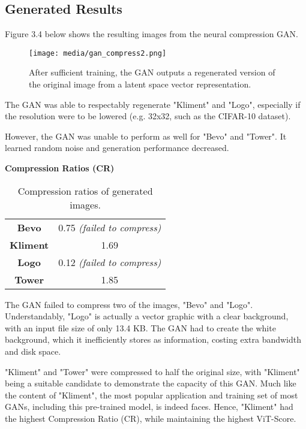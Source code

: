 \subsection{Generated Results}

Figure 3.4 below shows the resulting images from the neural compression GAN.

\begin{figure}[H]
	\begin{center}
	\texttt{[image: media/gan\_compress2.png]}
	\end{center}
	\caption[Neural Compression and Generation]{After sufficient training, the GAN outputs a regenerated
    version of the original image from a latent space vector representation.}
	\end{figure}

\vspace{5mm}   


The GAN was able to respectably regenerate "Kliment" and "Logo", especially if the resolution
were to be lowered (e.g. 32x32, such as the CIFAR-10 dataset).

However, the GAN was unable to perform as well for "Bevo" and "Tower".
It learned random noise and generation performance decreased.


\textbf{Compression Ratios (CR)}

\begin{table}[H]
\begin{center}
\begin{tabular}{|c|c|}
\hline
\textbf{Bevo}	& 0.75 \textit{(failed to compress)}\\
\textbf{Kliment}	& 1.69\\
\textbf{Logo}	& 0.12 \textit{(failed to compress)}\\
\textbf{Tower} & 1.85\\\hline

\end{tabular}
\caption[Results: Compression Ratios]{Compression ratios of generated images.}
\end{center}
\end{table}

The GAN failed to compress two of the images, "Bevo" and "Logo". Understandably,
"Logo" is actually a vector graphic with a clear background, with an input file size of only 13.4 KB.
The GAN had to create the white background, which it inefficiently stores as information, costing extra 
bandwidth and disk space.

"Kliment" and "Tower" were compressed to half the original size, with "Kliment"
being a suitable candidate to demonstrate the capacity of this GAN.
Much like the content of "Kliment", the most popular application and training set of most GANs, including this pre-trained model,
is indeed faces. Hence, "Kliment" had the highest Compression Ratio (CR), while maintaining the highest ViT-Score.


